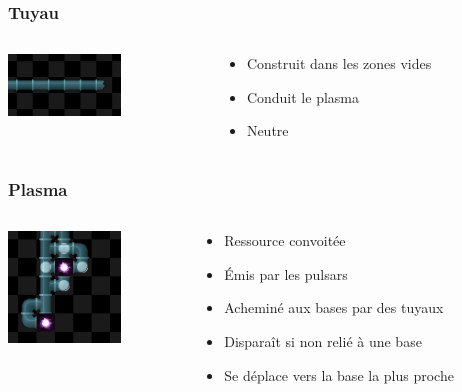 \documentclass{beamer}
\begin{document}
\begin{frame}
	\frametitle{Tuyau}
    \begin{columns}[T]
        \begin{column}{.3\textwidth}
            \includegraphics[width=3cm]{pictures/tuyau}
        \end{column}
        \begin{column}{.7\textwidth}
            \begin{itemize}
                \item Construit dans les zones vides
                \item Conduit le plasma
                \item Neutre
            \end{itemize}
        \end{column}
    \end{columns}
\end{frame}

\begin{frame}
	\frametitle{Plasma}
    \begin{columns}[T]
        \begin{column}{.3\textwidth}
            \includegraphics[width=3cm]{pictures/emission}
        \end{column}
        \begin{column}{.7\textwidth}
            \begin{itemize}
                \item Ressource convoitée
                \item Émis par les pulsars
                \item Acheminé aux bases par des tuyaux
                \item Disparaît si non relié à une base
                \item Se déplace vers la base la plus proche
            \end{itemize}
        \end{column}
    \end{columns}
\end{frame}
\end{document}
